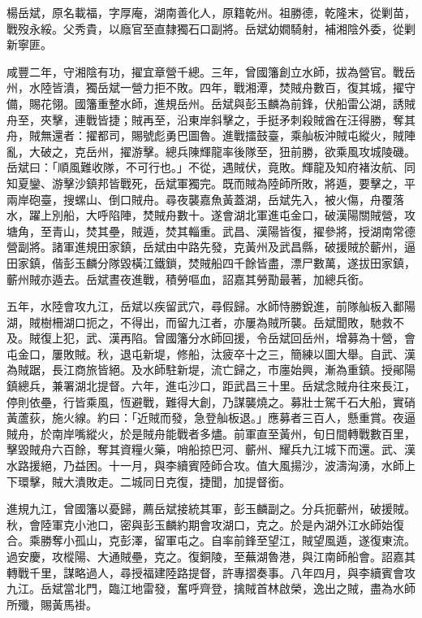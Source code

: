 \begin{pinyinscope}
楊岳斌，原名載福，字厚庵，湖南善化人，原籍乾州。祖勝德，乾隆末，從剿苗，戰歿永綏。父秀貴，以廕官至直隸獨石口副將。岳斌幼嫺騎射，補湘陰外委，從剿新寧匪。

咸豐二年，守湘陰有功，擢宜章營千總。三年，曾國籓創立水師，拔為營官。戰岳州，水陸皆潰，獨岳斌一營力拒不敗。四年，戰湘潭，焚賊舟數百，復其城，擢守備，賜花翎。國籓重整水師，進規岳州。岳斌與彭玉麟為前鋒，伏船雷公湖，誘賊舟至，夾擊，連戰皆捷；賊再至，沿東岸斜擊之，手挺矛刺殺賊酋在汪得勝，奪其舟，賊無還者：擢都司，賜號彪勇巴圖魯。進戰擂鼓臺，乘舢板沖賊屯縱火，賊陣亂，大破之，克岳州，擢游擊。總兵陳輝龍率後隊至，狃前勝，欲乘風攻城陵磯。岳斌曰：「順風難收隊，不可行也。」不從，遇賊伏，竟敗。輝龍及知府褚汝航、同知夏鑾、游擊沙鎮邦皆戰死，岳斌軍獨完。既而賊為陸師所敗，將遁，要擊之，平兩岸砲臺，搜螺山、倒口賊舟。尋夜襲嘉魚黃蓋湖，岳斌先入，被火傷，舟覆落水，躍上別船，大呼陷陣，焚賊舟數十。遂會湖北軍進屯金口，破漢陽關賊營，攻塘角，至青山，焚其壘，賊遁，焚其輜重。武昌、漢陽皆復，擢參將，授湖南常德營副將。諸軍進規田家鎮，岳斌由中路先發，克黃州及武昌縣，破援賊於蘄州，逼田家鎮，偕彭玉麟分隊毀橫江鐵鎖，焚賊船四千餘皆盡，漂尸數萬，遂拔田家鎮，蘄州賊亦遁去。岳斌晝夜進戰，積勞嘔血，詔嘉其勞勩最著，加總兵銜。

五年，水陸會攻九江，岳斌以疾留武穴，尋假歸。水師恃勝銳進，前隊舢板入鄱陽湖，賊樹柵湖口扼之，不得出，而留九江者，亦屢為賊所襲。岳斌聞敗，馳救不及。賊復上犯，武、漢再陷。曾國籓分水師回援，令岳斌回岳州，增募為十營，會屯金口，屢敗賊。秋，退屯新堤，修船，汰疲卒十之三，簡練以圖大舉。自武、漢為賊踞，長江商旅皆絕。及水師駐新堤，流亡歸之，市廛始興，漸為重鎮。授鄖陽鎮總兵，兼署湖北提督。六年，進屯沙口，距武昌三十里。岳斌念賊舟往來長江，停則依壘，行皆乘風，恆避戰，難得大創，乃謀襲燒之。募壯士駕千石大船，實硝黃蘆荻，施火線。約曰：「近賊而發，急登舢板退。」應募者三百人，懸重賞。夜逼賊舟，於南岸嘴縱火，於是賊舟能戰者多燼。前軍直至黃州，旬日間轉戰數百里，擊毀賊舟六百餘，奪其資糧火藥，哨船掠巴河、蘄州、耀兵九江城下而還。武、漢水路援絕，乃益困。十一月，與李續賓陸師合攻。值大風揚沙，波濤洶湧，水師上下環擊，賊大潰敗走。二城同日克復，捷聞，加提督銜。

進規九江，曾國籓以憂歸，薦岳斌接統其軍，彭玉麟副之。分兵扼蘄州，破援賊。秋，會陸軍克小池口，密與彭玉麟約期會攻湖口，克之。於是內湖外江水師始復合。乘勝奪小孤山，克彭澤，留軍屯之。自率前鋒至望江，賊望風遁，遂復東流。過安慶，攻樅陽、大通賊壘，克之。復銅陵，至蕪湖魯港，與江南師船會。詔嘉其轉戰千里，謀略過人，尋授福建陸路提督，許專摺奏事。八年四月，與李續賓會攻九江。岳斌當北門，臨江地雷發，奮呼齊登，擒賊首林啟榮，逸出之賊，盡為水師所殲，賜黃馬褂。


\end{pinyinscope}
